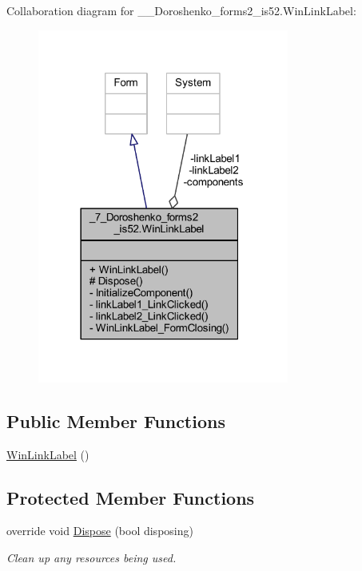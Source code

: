 Collaboration diagram for \+\_\+\_\+\+Doroshenko\+\_\+forms2\+\_\+is52.\+Win\+Link\+Label\+:
\nopagebreak
\begin{figure}[H]
\begin{center}
\leavevmode
\includegraphics[width=234pt]{class__7___doroshenko__forms2__is52_1_1_win_link_label__coll__graph}
\end{center}
\end{figure}
\subsection*{Public Member Functions}
\begin{DoxyCompactItemize}
\item 
\hyperlink{class__7___doroshenko__forms2__is52_1_1_win_link_label_ad1d9501e3b59f0c0cbe474dc8bb8c43c}{Win\+Link\+Label} ()
\end{DoxyCompactItemize}
\subsection*{Protected Member Functions}
\begin{DoxyCompactItemize}
\item 
override void \hyperlink{class__7___doroshenko__forms2__is52_1_1_win_link_label_a0f1a4f23e2e973eccf38925291bd01b3}{Dispose} (bool disposing)
\begin{DoxyCompactList}\small\item\em Clean up any resources being used. \end{DoxyCompactList}\end{DoxyCompactItemize}
